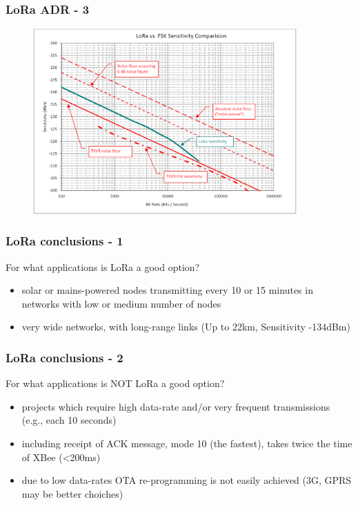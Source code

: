 \begin{frame}[fragile]
	\frametitle{LoRa ADR - 3}
	\begin{figure}
		\centering
		\includegraphics[width=0.9\textwidth]{img/lora_sensitivity.png}
	\end{figure}
\end{frame}

\begin{frame}[fragile]
  \frametitle{LoRa conclusions - 1}
  For what applications is LoRa a good option?
  \begin{itemize}
    \item solar or mains-powered nodes transmitting every 10 or 15 minutes in networks with low or medium number of nodes
    \item very wide networks, with long-range links (Up to 22km, Sensitivity -134dBm) 
  \end{itemize}
  
\end{frame}
  
 \begin{frame}[fragile]
  \frametitle{LoRa conclusions - 2}
  For what applications is NOT LoRa a good option?
  \begin{itemize}
    \item projects which require high data-rate and/or very frequent transmissions (e.g., each 10 seconds)
    \item including receipt of ACK message, mode 10 (the fastest), takes twice the time of XBee (<200ms)
    \item due to low data-rates OTA re-programming is not easily achieved (3G, GPRS may be better choiches)
  \end{itemize}
 
\end{frame}

